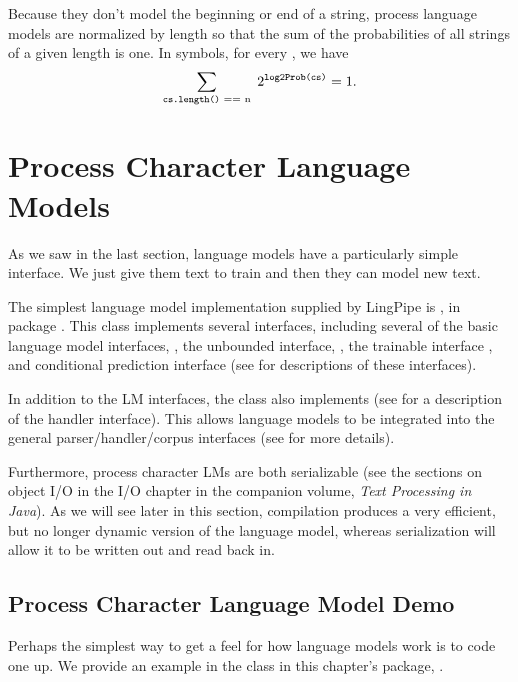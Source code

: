 Because they don't model the beginning or end of a string, process
language models are normalized by length so that the sum of the
probabilities of all strings of a given length is one.  In symbols,
for every , we have
%
\begin{equation}
\sum_{\text{{\ttfamily cs.length()} == n}} \hspace*{3pt} 2^{\text{{\ttfamily log2Prob(cs)}}} = 1.
\end{equation}
%


\section{Process Character Language Models}

As we saw in the last section, language models have a particularly
simple interface.  We just give them text to train and then they
can model new text. 

The simplest language model implementation supplied by LingPipe is
, in package .  This class
implements several interfaces, including several of the basic language
model interfaces, , the unbounded interface,
, the trainable interface
, and conditional prediction interface
 (see  for
descriptions of these interfaces).

In addition to the LM interfaces, the  class also
implements  (see
 for a description of the handler interface).
This allows language models to be integrated into the general
parser/handler/corpus interfaces (see  for more
details).

Furthermore, process character LMs are both serializable (see the
sections on object I/O in the I/O chapter in the companion volume,
{\it Text Processing in Java}).  As we will see later in this section,
compilation produces a very efficient, but no longer dynamic version
of the language model, whereas serialization will allow it to be
written out and read back in.


\subsection{Process Character Language Model Demo}\label{section:char-lm-process-demo}

Perhaps the simplest way to get a feel for how language models work is
to code one up.  We provide an example in the class
 in this chapter's package,
.  

